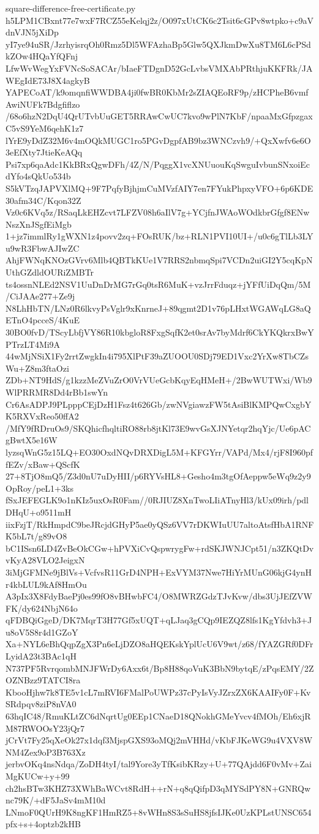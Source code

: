 \documentclass[11pt]{article}
\theoremstyle{definition}
\theoremstyle{remark}
\begin{document}
\begin{filecontents*}[overwrite]{square-difference-free-certificate.py}
h5LPM1CBxnt77e7wxF7RCZ55eKelqj2z/O097xUtCK6c2Tsit6cGPv8wtpko+c9aVdnVJN5jXiDp
yI7ye94uSR/JzrhyisrqOh0Rmz5Dl5WFAzhaBp5Glw5QXJkmDwXu8TM6L6cPSdkZOw4HQaYfQFnj
LfwWvWegYxFVNcSoSACAr/bIaeFTDgnD52GcLvbsVMXAbPRthjuKKFRk/JAWEgIdE73J8X4agkyB
YAPECoAT/k9omqnfiWWDBA4ji0fwBR0KbMr2sZIAQEoRF9p/zHCPheB6vmfAwiNUFk7Bdgfiflzo
/68o6hzN2DqU4QrUTvbUuGET5RRAwCwUC7kvo9wPlN7KbF/npaaMxGfpzgaxC5vS9YeM6qehK1z7
lYrE9yDdZ32M6v4mOQkMUGC1ro5PGvDgpfAB9bz3WNCzvh9/+QxXwfv6e6O3eEfXty7JtieKeAQq
Psi7xp6qaAdc1KkBRxQgwDFh/4Z/N/PqggX1vcXNUuouKqSwguIvbunSNxoiEcdYfo4sQkUo534b
S5kVTzqJAPVXlMQ+9F7PqfyBjhjmCuMVzfAIY7en7FYukPhpxyVFO+6p6KDE30afm34C/Kqon32Z
Vz0c6KVq5z/RSaqLkEHZcvt7LFZV08h6aIlV7g+YCjfnJWAoWOdkbrGfgf8ENwNszXnJSgfEiMgb
1+jz7immlRy1gWXN1z4povv2zq+FOsRUK/bz+RLN1PVI10UI+/u0c6gTlLb3LYu9wR3FbwAJIwZC
AhjFWNqKNOzGVrv6Mlb4QBTkKUe1V7RRS2nbmqSpi7VCDn2uiGI2Y5cqKpNUthGZdldOURiZMBTr
ts4ossnNLEd2NSV1UuDnDrMG7rGq0tsR6MuK+vzJrrFduqz+jYFfUiDqQm/5M/CiJAAe277+Ze9j
N8LhHbTN/LNz0R6lkvyPsVglr9xKnrneJ+89qgmt2D1v76pLHxtWGAWqLG8aQETnO4pcceS/4KuE
30BO0fvD/TScyLbfjVY86R10kbgloR8FxgSqfK2et0srAv7byMdrf6CkYKQkrxBwYPTrzLT4Mi9A
44wMjNSiX1Fy2rrtZwgkIn4i795XlPtF39aZUOOU0SDj79ED1Vxc2YrXw8TbCZsWu+Z8m3ftaOzi
ZDb+NT9HdS/g1kzzMeZVuZrO0VrVUeGcbKqyEqHMeH+/2BwWUTWxi/Wb9WlPRRMR8Dd4rBb1swYn
Cr6AsADPJ9PLpppCEjDzH1Fsz4t626Gb/zwNVgiawzFW5tAsiBlKMPQwCxgbYK5RXVxReo50ffA2
/MfY9fRDruOs9/SKQhicfhqltiRO88rb8jtKl73E9wvGsXJNYetqr2hqYjc/Ue6pACgBwtX5e16W
lyzsqWnG5z15LQ+EO30OxdNQvDRXDigL5M+KFGYrr/VAPd/Mx4/rjF8I960pffEZv/xBaw+QScfK
27+8TjO8mQ5/Z3d0nU7uDyHII/p6RYVsHL8+Gesho4m3tgOfAeppw5eWq9z2y9OpRoy/peL1+3ks
fSxJEFEGLK9o1nKIz5uxOsR0Fam//0RJIUZ8XnTwoLIiATnyHl3/kUx09irh/pdlDHqU+o9511mH
iixFzjT/RkHmpdC9beJRcjdGHyP5ae0yQSz6VV7rDKWIuUU7altoAtsfHbA1RNFK5bL7t/g89vO8
bC1ISsn6LD4ZvBeOkCGw+hPVXiCvQspwrygFw+rdSKJWNJCpt51/n3ZKQtDvvKyA28VLO2JeigxN
3iMjGFMNe9jBlVs+VcfvsR11GrD4NPH+ExVYM37Nwe7HiYrMUnG06kjG4ynHr4kbLUL9kAf8HmOu
A3pIx3X8FdyBaePj0es99fO8vBHwbFC4/O8MWRZGdzTJvKvw/dbs3UjJEfZVWFK/dy624NbjN64o
qFDBQiGgeD/DK7MqrT3H77Gf5xUQT+qLJaq3gCQp9IEZQZ8lfs1KgYfdvh3+Ju8oV5S8r4d1GZoY
Xa+NYL6eBhQqpZgX3Pn6eLjDZO8aHQEKskYplUcU6V9wt/z68/fYAZGRf0DFrLyidA23t3BAc1qH
N737PF5RvrqombMNJFWrDy6Axx6t/Bp8H88qoVuK3BbN9bytqE/zPqsEMY/2ZOZNBzz9TATCI8ra
KbooHjhw7k8TE5v1cL7mRVI6FMalPoUWPz37cPyIsVyJZrxZX6KAAIFy0F+KvSRdpqv8ziP8nVA0
63hqIC48/RmuKLtZC6dNqrtUg0EEp1CNaeD18QNokhGMeYvcv4fMOh/Eh6xjRM87RWOOsY23jQr7
jCrVt7Fy25qXeOk27x1dqf3MjspGXS93oMQj2mVHHd/vKbFJKeWG9u4VXV8WNM4Zex9oP3B763Xz
jerbvOKq4nsNdqa/ZoDH4tyI/tal9Yore3yTfKsibKRzy+U+77QAjdd6F0vMv+ZaiMgKUCw+y+99
ch2hsBTw3KHZ73XWhBaWCvt8RdH++rN+q8qQifpD3qMYSdPY8N+GNRQwnc79K/+dF5JaSv4mM10d
LNmoF0QUrH9K8ngKF1HmRZ5+8vWHn8S3sSuHS8jfsIJKe0UzKPLstUNSC654pfx+s+4optzb2kHB

\end{filecontents*}
\end{document}
